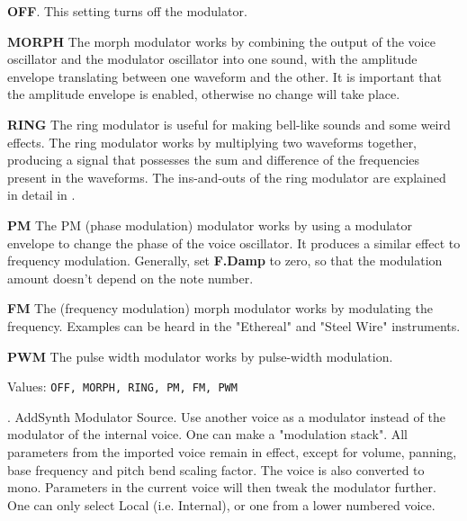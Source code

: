    \begin{enumber}
      \item \textbf{OFF}.
         This setting turns off the modulator.
      \item \textbf{MORPH}
         The morph modulator works by combining the output of the voice oscillator
         and the modulator oscillator into one sound, with the amplitude envelope
         translating between one waveform and the other. It is important that the
         amplitude envelope is enabled, otherwise no change will take place.

      \item \textbf{RING}
         The ring modulator is useful for making bell-like sounds and some
         weird effects.  The ring modulator works by multiplying two
         waveforms together, producing a signal that possesses the sum and
         difference of the frequencies present in the waveforms.  The
         ins-and-outs of the ring modulator are explained in detail in
         .
      \item \textbf{PM}
         The PM (phase modulation) modulator works by using a modulator
         envelope to change the phase of the voice oscillator. It produces a
         similar effect to frequency modulation.
         Generally, set \textbf{F.Damp} to zero, so that the modulation amount
         doesn't depend on the note number.
      \item \textbf{FM}
         The (frequency modulation) morph modulator works by modulating the
         frequency.  Examples can be heard in the "Ethereal" and "Steel Wire"
         instruments.
      \item \textbf{PWM}
         The pulse width modulator works by pulse-width modulation.
   \end{enumber}

   Values: \texttt{OFF, MORPH, RING, PM, FM, PWM}

   .
   AddSynth Modulator Source.
   Use another voice as a modulator instead of the modulator of the internal
   voice. One can make a "modulation stack". All parameters from the imported
   voice remain in effect, except for volume, panning, base frequency and pitch
   bend scaling factor. The voice is also converted to mono. Parameters in the
   current voice will then tweak the modulator further.  One can only select
   Local (i.e. Internal), or one from a lower numbered voice.

